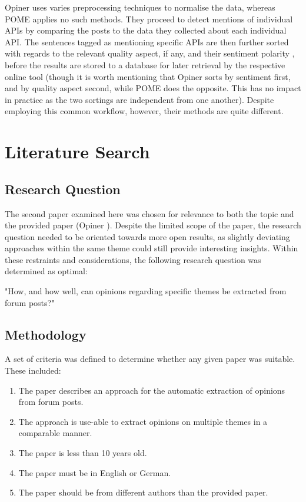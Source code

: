 \documentclass[a4paper,10pt, bibliography=totocnumbered]{scrreprt}
\begin{document}
Opiner uses varies preprocessing techniques to normalise the data, whereas POME applies no such methods. They proceed to detect mentions of individual APIs by comparing the posts to the data they collected about each individual API. The sentences tagged as mentioning specific APIs are then further sorted with regards to the relevant quality aspect, if any, and their sentiment polarity , before the results are stored to a database for later retrieval by the respective online tool (though it is worth mentioning that Opiner sorts by sentiment first, and by quality aspect second, while POME does the opposite. This has no impact in practice as the two sortings are independent from one another). Despite employing this common workflow, however, their methods are quite different.


\chapter{Literature Search}

\section{Research Question}
The second paper examined here was chosen for relevance to both the topic and the provided paper (Opiner \cite{OPINER}). Despite the limited scope of the paper, the research question needed to be oriented towards more open results, as slightly deviating approaches within the same theme could still provide interesting insights. Within these restraints and considerations, the following research question was determined as optimal:
\begin{center}
    "How, and how well, can opinions regarding specific themes be extracted from forum posts?"
\end{center}

\section{Methodology}

A set of criteria was defined to determine whether any given paper was suitable. These included:

\begin{enumerate}
    \item The paper describes an approach for the automatic extraction of opinions from forum posts.
    \item The approach is use-able to extract opinions on multiple themes in a comparable manner.
    \item The paper is less than 10 years old.
    \item The paper must be in English or German.
    \item The paper should be from different authors than the provided paper.
\end{enumerate}
\end{document}

